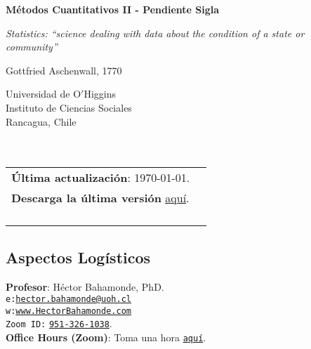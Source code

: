 \documentclass[letterpaper]{article}
\def\name{M\'etodos Cuantitativos II - Pendiente Sigla}
\begin{document}

\centerline{\huge \bf \name}

\epigraph{\emph{Statistics: ``science dealing with data about the condition of a state or community''}}{Gottfried Aschenwall, 1770}


\vspace{0.25in}

\begin{minipage}{0.45\linewidth}
 Universidad de O$'$Higgins \\
  Instituto de Ciencias Sociales \\
  Rancagua, Chile\\
  \\
  \\

\end{minipage}
\hspace{4cm}\begin{minipage}{0.45\linewidth}
  \begin{tabular}{ll}
{\bf \'Ultima actualizaci\'on}: \today. \\
 {\bf Descarga la \'ultima versi\'on} \href{https://github.com/hbahamonde/MLE/raw/master/Bahamonde_MLE.pdf}{aqu\'i}.%
    \\
    \\
    \\
    \\
    \\
  \end{tabular}
\end{minipage}



\subsection*{Aspectos Log\'isticos}


\vspace{1mm}
{\bf Profesor}: H\'ector Bahamonde, PhD.\\
\texttt{e:}\href{mailto:hector.bahamonde@uoh.cl}{\texttt{hector.bahamonde@uoh.cl}}\\
\texttt{w:}\href{http://www.hectorbahamonde.com}{\texttt{www.HectorBahamonde.com}}\\
\texttt{Zoom ID:} \href{https://us02web.zoom.us/j/9513261038?pwd=S3BSWXQxZW11NC9CRjRoMmd0TkpEZz09}{\texttt{951-326-1038}}.\\
{\bf Office Hours (Zoom)}: Toma una hora \href{https://calendly.com/bahamonde/officehours}{\texttt{aqu\'i}}.
\end{document}

